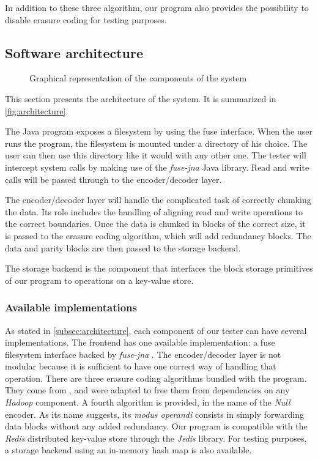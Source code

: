 In addition to these three algorithm, our program also provides the possibility to disable erasure coding for testing purposes.

\subsection{Software architecture}
\label{subsec:architecture}

\begin{figure*}
	\centering
	
	\caption{Graphical representation of the components of the system}
	\label{fig:architecture}
\end{figure*}

This section presents the architecture of the system.
It is summarized in \autoref{fig:architecture}.

The Java program exposes a filesystem by using the \ac{fuse} interface.
When the user runs the program, the filesystem is mounted under a directory of his choice.
The user can then use this directory like it would with any other one.
The tester will intercept system calls by making use of the \textit{fuse-jna} \autocite{fuse-jna} Java library.
Read and write calls will be passed through to the encoder/decoder layer.

The encoder/decoder layer will handle the complicated task of correctly chunking the data.
Its role includes the handling of aligning read and write operations to the correct boundaries.
Once the data is chunked in blocks of the correct size, it is passed to the erasure coding algorithm, which will add redundancy blocks.
The data and parity blocks are then passed to the storage backend.

The storage backend is the component that interfaces the block storage primitives of our program to operations on a key-value store.

\subsubsection{Available implementations}

As stated in \autoref{subsec:architecture}, each component of our tester can have several implementations.
The frontend has one available implementation: a \ac{fuse} filesystem interface backed by \textit{fuse-jna} \autocite{fuse-jna}.
The encoder/decoder layer is not modular because it is sufficient to have one correct way of handling that operation.
There are three erasure coding algorithms bundled with the program.
They come from \autocite{XorbasVLDB}, and were adapted to free them from dependencies on any \textit{Hadoop} component.
A fourth algorithm is provided, in the name of the \textit{Null} encoder.
As its name suggests, its \textit{modus operandi} consists in simply forwarding data blocks without any added redundancy.
Our program is compatible with the \textit{Redis} distributed key-value store through the \textit{Jedis} library.
For testing purposes, a storage backend using an in-memory hash map is also available.

